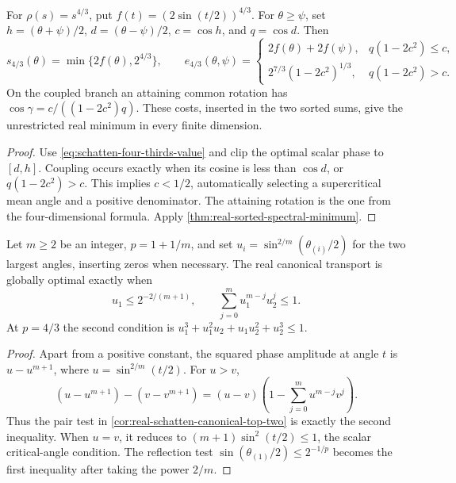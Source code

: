 \begin{corollary}
\label{cor:real-four-thirds-matching}
For $\rho(s)=s^{4/3}$, put $f(t)=(2\sin(t/2))^{4/3}$.
For $\theta\geq\psi$, set $h=(\theta+\psi)/2$,
$d=(\theta-\psi)/2$, $c=\cos h$, and $q=\cos d$.
Then
\[
 s_{4/3}(\theta)=\min\{2f(\theta),2^{4/3}\},\qquad
 e_{4/3}(\theta,\psi)=
 \begin{cases}
  2f(\theta)+2f(\psi),&q(1-2c^2)\leq c,\\
  2^{7/3}(1-2c^2)^{1/3},&q(1-2c^2)>c.
 \end{cases}
\]
On the coupled branch an attaining common rotation has
$\cos\gamma=c/((1-2c^2)q)$. These costs, inserted in the two
sorted sums, give the unrestricted real minimum in every finite dimension.
\end{corollary}

\begin{proof}
Use \cref{eq:schatten-four-thirds-value} and clip the optimal scalar
phase to $[d,h]$. Coupling occurs exactly when its cosine is less
than $\cos d$, or $q(1-2c^2)>c$. This implies $c<1/2$, automatically
selecting a supercritical mean angle and a positive denominator.
The attaining rotation is the one from the four-dimensional formula.
Apply \cref{thm:real-sorted-spectral-minimum}.
\end{proof}

\begin{corollary}
\label{cor:real-reciprocal-integer-canonical}
Let $m\geq2$ be an integer, $p=1+1/m$, and set
$u_i=\sin^{2/m}(\theta_{(i)}/2)$ for the two largest angles,
inserting zeros when necessary. The real canonical transport is globally
optimal exactly when
\begin{equation}
 u_1\leq2^{-2/(m+1)},\qquad
 \sum_{j=0}^{m}u_1^{m-j}u_2^j\leq1.
 \label{eq:real-reciprocal-integer-canonical}
\end{equation}
At $p=4/3$ the second condition is
$u_1^3+u_1^2u_2+u_1u_2^2+u_2^3\leq1$.
\end{corollary}

\begin{proof}
Apart from a positive constant, the squared phase amplitude at angle $t$
is $u-u^{m+1}$, where $u=\sin^{2/m}(t/2)$. For $u>v$,
\[
 (u-u^{m+1})-(v-v^{m+1})
    =(u-v)\left(1-\sum_{j=0}^{m}u^{m-j}v^j\right).
\]
Thus the pair test in \cref{cor:real-schatten-canonical-top-two} is exactly
the second inequality. When $u=v$, it reduces to
$(m+1)\sin^2(t/2)\leq1$, the scalar critical-angle condition.
The reflection test $\sin(\theta_{(1)}/2)\leq2^{-1/p}$ becomes the
first inequality after taking the power $2/m$.
\end{proof}

